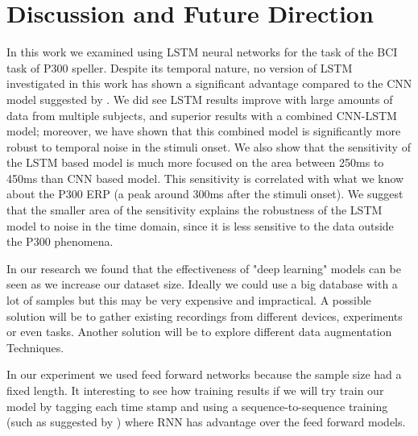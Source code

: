 \documentclass[
12pt, %
english, %
doublespacing, %
headsepline, %
]{MastersDoctoralThesis} %
\begin{document}
\chapter{Discussion and Future Direction}
In this work we examined using LSTM neural networks for the task of the BCI task of P300 speller. Despite its temporal nature, no version of LSTM investigated in this work has shown a significant advantage compared to the CNN model suggested by \cite{P300_CNN}. We did see LSTM results improve with large amounts of data from multiple subjects, and superior results with a combined CNN-LSTM model; moreover, we have shown that this combined model is significantly more robust to temporal noise in the stimuli onset. We also show that the sensitivity of the LSTM based model is much more focused on the area between 250ms to 450ms than CNN based model. This sensitivity is correlated with what we know about the P300 ERP (a peak around 300ms after the stimuli onset). We suggest that the smaller area of the sensitivity explains the robustness of the LSTM model to noise in the time domain, since it is less sensitive to the data outside the P300 phenomena. 

In our research we found that the effectiveness of "deep learning" models can be seen as we increase our dataset size. Ideally we could use a big database with a lot of samples but this may be very expensive and impractical. A possible solution will be to gather existing recordings from different devices, experiments or even tasks. Another solution will be to explore different data augmentation Techniques. 

In our experiment we used feed forward networks because the sample size had a fixed length. It interesting to see how training results if we will try train our model by tagging each time stamp and using a sequence-to-sequence training (such as suggested by \cite{graves2012supervised}) where RNN has advantage over the feed forward models.


\renewcommand{\bibsection}{\section{References}}





\end{document}
